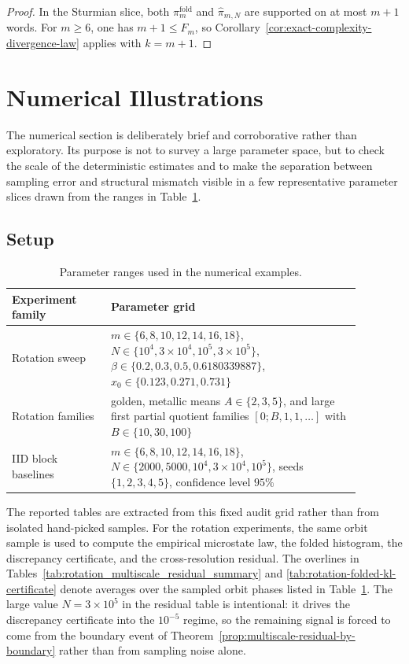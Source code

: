 \documentclass[11pt,letterpaper]{article}
\numberwithin{equation}{section}
\theoremstyle{plain}
\theoremstyle{definition}
\theoremstyle{remark}
\begin{document}
\begin{proof}
In the Sturmian slice, both \(\pi_m^{\mathrm{fold}}\) and \(\hat\pi_{m,N}\) are
supported on at most \(m+1\) words. For \(m\ge 6\), one has \(m+1\le F_m\), so
Corollary~\ref{cor:exact-complexity-divergence-law} applies with \(k=m+1\).
\end{proof}

\section{Numerical Illustrations}

The numerical section is deliberately brief and corroborative rather than
exploratory. Its purpose is not to survey a large parameter space, but to check
the scale of the deterministic estimates and to make the separation between
sampling error and structural mismatch visible in a few representative parameter
slices drawn from the ranges in
Table~\ref{tab:parameter-grid}.

\subsection{Setup}

\begin{table}[H]
\centering
\small
\begin{tabular}{>{\raggedright\arraybackslash}p{0.25\linewidth} >{\raggedright\arraybackslash}p{0.63\linewidth}}
\toprule
Experiment family & Parameter grid \\
\midrule
Rotation sweep &
$m\in\{6,8,10,12,14,16,18\}$,
$N\in\{10^4,3\times 10^4,10^5,3\times 10^5\}$,
$\beta\in\{0.2,0.3,0.5,0.6180339887\}$,
$x_0\in\{0.123,0.271,0.731\}$ \\
Rotation families &
golden, metallic means $A\in\{2,3,5\}$, and large first partial quotient
families $[0;B,1,1,\dots]$ with $B\in\{10,30,100\}$ \\
IID block baselines &
$m\in\{6,8,10,12,14,16,18\}$,
$N\in\{2000,5000,10^4,3\times 10^4,10^5\}$,
seeds $\{1,2,3,4,5\}$, confidence level $95\%$ \\
\bottomrule
\end{tabular}
\caption{Parameter ranges used in the numerical examples.}
\label{tab:parameter-grid}
\end{table}

The reported tables are extracted from this fixed audit grid rather than from
isolated hand-picked samples. For the rotation experiments, the same orbit
sample is used to compute the empirical microstate law, the folded histogram,
the discrepancy certificate, and the cross-resolution residual. The overlines
in Tables~\ref{tab:rotation_multiscale_residual_summary} and
\ref{tab:rotation-folded-kl-certificate} denote averages over the sampled orbit
phases listed in Table~\ref{tab:parameter-grid}. The large value
\(N=3\times 10^5\) in the residual table is intentional: it drives the
discrepancy certificate into the \(10^{-5}\) regime, so the remaining signal is
forced to come from the boundary event of
Theorem~\ref{prop:multiscale-residual-by-boundary} rather than from sampling
noise alone.
\end{document}
